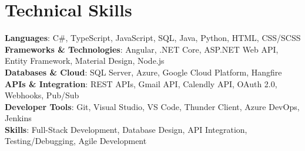 \documentclass[letterpaper,11pt]{article}
\begin{document}
\section{Technical Skills}
 \begin{itemize}[leftmargin=0.15in, label={}]
    \small{\item{
     \textbf{Languages}{: C\#, TypeScript, JavaScript, SQL, Java, Python, HTML, CSS/SCSS} \\
     \textbf{Frameworks \& Technologies}{: Angular, .NET Core, ASP.NET Web API, Entity Framework, Material Design, Node.js} \\
     \textbf{Databases \& Cloud}{: SQL Server, Azure, Google Cloud Platform, Hangfire} \\
     \textbf{APIs \& Integration}{: REST APIs, Gmail API, Calendly API, OAuth 2.0, Webhooks, Pub/Sub} \\
     \textbf{Developer Tools}{: Git, Visual Studio, VS Code, Thunder Client, Azure DevOps, Jenkins} \\
     \textbf{Skills}{: Full-Stack Development, Database Design, API Integration, Testing/Debugging, Agile Development}
    }}
 \end{itemize}

\end{document}
